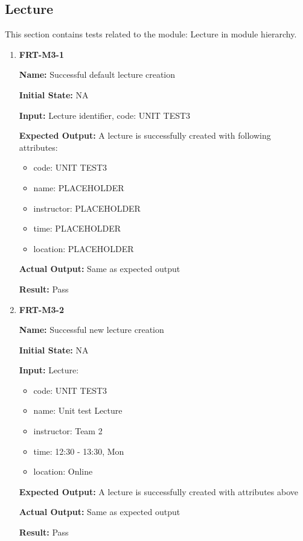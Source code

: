 \documentclass[12pt, titlepage]{article}
\begin{document}
\subsection{Lecture}
This section contains tests related to the module: Lecture in module hierarchy.
\begin{enumerate}
\item \textbf{FRT-M3-1}

\textbf{Name:} Successful default lecture creation

\textbf{Initial State:} NA

\textbf{Input:} Lecture identifier, code: UNIT TEST3

\textbf{Expected Output:} A lecture is successfully created with following attributes:
\begin{itemize}
\item code: UNIT TEST3
\item name: PLACEHOLDER
\item instructor: PLACEHOLDER
\item time: PLACEHOLDER
\item location: PLACEHOLDER
\end{itemize}

\textbf{Actual Output:} Same as expected output

\textbf{Result:} Pass

\item \textbf{FRT-M3-2}

\textbf{Name:} Successful new lecture creation

\textbf{Initial State:} NA

\textbf{Input:} Lecture:
\begin{itemize}
\item code: UNIT TEST3
\item name: Unit test Lecture
\item instructor: Team 2
\item time: 12:30 - 13:30, Mon
\item location: Online
\end{itemize}

\textbf{Expected Output:} A lecture is successfully created with attributes above

\textbf{Actual Output:} Same as expected output

\textbf{Result:} Pass
\end{enumerate}
\end{document}
